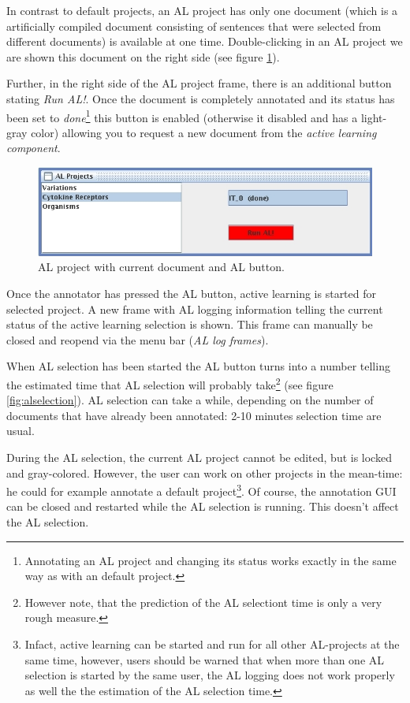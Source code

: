 \documentclass[DIV12,english,11pt,halfparskip]{scrartcl}
\begin{document}
In contrast to default projects, an AL project has only one document
(which is a artificially compiled document consisting of sentences
that were selected from different documents) is available at one time.
Double-clicking in an AL project we are shown this document on the
right side (see figure \ref{fig:alproject}).

Further, in the right side of the AL project frame, there is an
additional button stating \textit{Run AL!}. Once the document is
completely annotated and its status has been set to
\emph{done}\footnote{Annotating an AL project and changing its status
  works exactly in the same way as with an default project.} this
button is enabled (otherwise it disabled and has a light-gray color)
allowing you to request a new document from the \emph{active learning
  component}.

\begin{figure}[h]
  \centering
  \includegraphics[scale=0.66]{figs/ALButton2.jpg}
  \caption{AL project with current document and AL button.}
  \label{fig:alproject}
\end{figure}

Once the annotator has pressed the AL button, active learning is started
for selected project. A new frame with AL logging information telling
the current status of the active learning selection is shown. This
frame can manually be closed and reopend via the menu bar (\textit{AL
  log frames}). 

When AL selection has been started the AL button turns into a number
telling the estimated time that AL selection will probably
take\footnote{However note, that the prediction of the AL selectiont
  time is only a very rough measure.} (see figure
\ref{fig:alselection}). AL selection can take a while, depending on
the number of documents that have already been annotated: 2-10 minutes
selection time are usual.

During the AL selection, the current AL project cannot be edited, but
is locked and gray-colored. However, the user can work on other
projects in the mean-time: he could for example annotate a default
project\footnote{Infact, active learning can be started and run for
  all other AL-projects at the same time, however, users should be
  warned that when more than one AL selection is started by the same
  user, the AL logging does not work properly as well the the
  estimation of the AL selection time.}.  Of course, the annotation
GUI can be closed and restarted while the AL selection is running.
This doesn't affect the AL selection.
\end{document}
